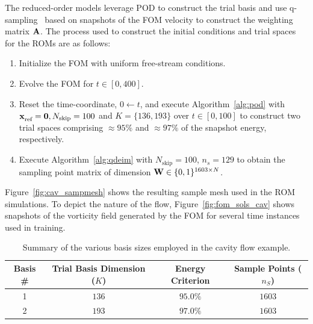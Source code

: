 The reduced-order models leverage POD to construct the trial basis and use q-sampling~\cite{qdeim_drmac} based on snapshots of the FOM velocity to construct the weighting 
matrix $\stweightingMatArg{n}$. The process used to construct the initial conditions and trial spaces for the ROMs are as follows:
\begin{enumerate}
\item Initialize the FOM with uniform free-stream conditions.
\item Evolve the FOM for $t \in [0,400]$.
\item Reset the time-coordinate, $0 \leftarrow t$, and execute Algorithm~\ref{alg:pod} with $\stateInterceptArg{} = \bz, N_{\text{skip}} = 100$ and $K = \{136,193\}$ over $t \in [0,100]$ to construct two trial spaces comprising $\approx 95\%$ and $\approx 97\%$ of the snapshot energy, respectively. 
\item Execute Algorithm~\ref{alg:qdeim} with $N_{\text{skip}} = 100$, $n_s = 129$ to obtain the sampling point matrix of dimension $\stweightingMatOneArg{} \in \{0,1\}^{1603 \times \fomdim }$. 
\end{enumerate}
Figure~\ref{fig:cav_sampmesh} shows the resulting sample mesh used in the ROM simulations. To depict the nature of the flow, Figure~\ref{fig:fom_sols_cav} shows snapshots of the vorticity field generated by the FOM for several time instances used in training.  
\begin{table}[]
\begin{centering}
\begin{tabular}{c c c c}
\hline
Basis \# & Trial Basis Dimension ($K$) &  Energy Criterion & Sample Points ($n_S$) \\
\hline
1    & $136$ & $95.0\%$ & $1603$ \\
2    & $193$ & $97.0\%$ & $1603$ \\
\hline
\end{tabular}
\caption{Summary of the various basis sizes employed in the cavity flow example.}
\label{tab:rom_basis_details}
\end{centering}
\end{table}

